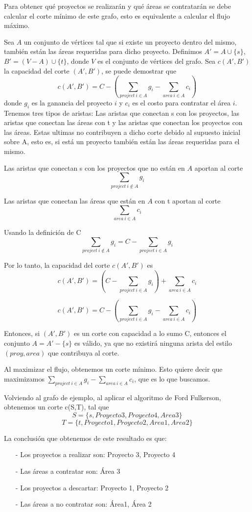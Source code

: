 Para obtener qué proyectos se realizarán y qué áreas se contratarán se debe calcular el corte mínimo de este grafo, esto es equivalente a calcular el flujo máximo. 


Sea $A$ un conjunto de vértices tal que si existe un proyecto dentro del mismo, también están las áreas requeridas para dicho proyecto.
Definimos $A' = A \cup \{s\}$, $B' = (V - A) \cup \{t\}$, donde $V$ es el conjunto de vértices del grafo.
Sea $c(A',B')$ la capacidad del corte $(A',B')$, se puede demostrar que 
$$c(A', B') = C - \left(\sum_{project\ i \in A} g_i - \sum_{area\ i \in A} c_i\right)$$
donde $g_i$ es la ganancia del proyecto $i$ y $c_i$ es el costo para contratar el área $i$.
Tenemos tres tipos de aristas: Las aristas que conectan s con los proyectos, las aristas que conectan las áreas con t y las aristas que conectan los proyectos con las áreas.
Estas ultimas no contribuyen a dicho corte debido al supuesto inicial sobre A, esto es, si está un proyecto también están las áreas requeridas para el mismo.

Las aristas que conectan s con los proyectos que no están en $A$ aportan al corte
$$ \sum_{project\ i \notin A} g_i $$

Las aristas que conectan las áreas que están en $A$ con t aportan al corte
$$ \sum_{area\ i \in A} c_i $$

Usando la definición de C
$$ \sum_{project\ i \notin A} g_i = C - \sum_{project\ i \in A} g_i$$

Por lo tanto, la capacidad del corte $c(A',B')$ es
$$c(A',B') = \left( C - \sum_{project\ i \in A} g_i \right)+  \sum_{area\ i \in A} c_i $$

$$c(A',B') = C - \left(\sum_{project\ i \in A} g_i - \sum_{area\ i \in A} c_i \right)$$


Entonces, si $(A', B')$ es un corte con capacidad a lo sumo C, entonces el conjunto $A = A' -\{s\}$ es válido, ya que no existirá ninguna arista del estilo $(proy, area)$ que 
contribuya al corte.

Al maximizar el flujo, obtenemos un corte mínimo. Esto quiere decir que maximizamos $\sum_{project\ i \in A} g_i - \sum_{area\ i \in A} c_i$, que es lo que buscamos.



Volviendo al grafo de ejemplo, al aplicar el algoritmo de Ford Fulkerson, obtenemos un corte c(S,T), tal que $$S = \{ s, Proyecto 3, Proyecto 4, Area 3\}$$ 
$$ T = \{ t, Proyecto 1, Proyecto 2, Area 1, Area 2 \}$$

La conclusión que obtenemos de este resultado es que:
\begin{itemize}
 \item[-] Los proyectos a realizar son: Proyecto 3, Proyecto 4
 \item[-] Las áreas a contratar son: Área 3
 \item[-] Los proyectos a descartar: Proyecto 1, Proyecto 2
 \item[-] Las áreas a no contratar son: Área1, Área 2
\end{itemize}

